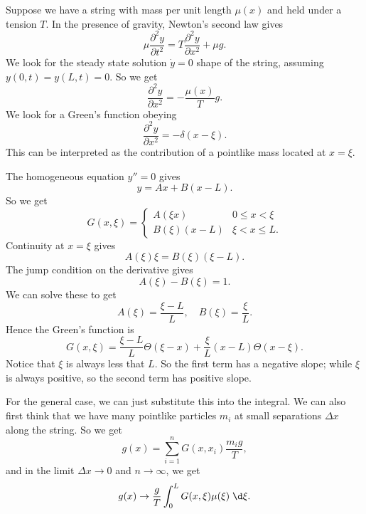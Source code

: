 \documentclass[a4paper]{article}
\begin{document}
\begin{eg}
  Suppose we have a string with mass per unit length $\mu(x)$ and held under a tension $T$. In the presence of gravity, Newton's second law gives
  \[
    \mu\frac{\partial^2 y}{\partial t^2} = T \frac{\partial^2 y}{\partial x^2} + \mu g.
  \]
  We look for the steady state solution $\dot{y} = 0$ shape of the string, assuming $y(0, t) = y(L, t) = 0$. So we get
  \[
    \frac{\partial^2 y}{\partial x^2} = -\frac{\mu(x)}{T}g.
  \]
  We look for a Green's function obeying
  \[
    \frac{\partial^2 y}{\partial x^2} = - \delta(x - \xi).
  \]
  This can be interpreted as the contribution of a pointlike mass located at $x = \xi$.
  \begin{center}
  \end{center}
  The homogeneous equation $y'' = 0$ gives
  \[
    y = Ax + B(x - L).
  \]
  So we get
  \[
    G(x, \xi) =
    \begin{cases}
      A(\xi x) & 0 \leq x < \xi\\
      B(\xi)(x - L) & \xi < x \leq L.
    \end{cases}
  \]
  Continuity at $x = \xi$ gives
  \[
    A(\xi)\xi = B(\xi) (\xi -L).
  \]
  The jump condition on the derivative gives
  \[
    A(\xi) - B(\xi) = 1.
  \]
  We can solve these to get
  \[
    A(\xi) = \frac{\xi - L}{L},\quad B(\xi) = \frac{\xi}{L}.
  \]
  Hence the Green's function is
  \[
    G(x, \xi) = \frac{\xi - L}{L} \Theta(\xi - x) + \frac{\xi}{L}(x - L) \Theta(x - \xi).
  \]
  Notice that $\xi$ is always less that $L$. So the first term has a negative slope; while $\xi$ is always positive, so the second term has positive slope.

  For the general case, we can just substitute this into the integral. We can also first think that we have many pointlike particles $m_i$ at small separations $\Delta x$ along the string. So we get
  \[
    g(x) = \sum_{i = 1}^n G(x, x_i) \frac{m_i g}{T},
  \]
  and in the limit $\Delta x \to 0$ and $n \to \infty$, we get
  \[
    g(x) \to \frac{g}{T} \int_0^L G(x, \xi) \mu(\xi)\;\d \xi.
  \]
\end{eg}
\end{document}
